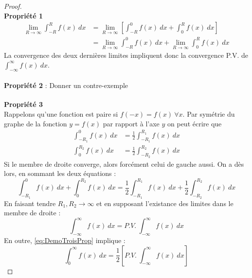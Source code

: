 	\begin{proof}\ \\
	\textbf{Propriété 1}
	\begin{equation}
		\begin{array}{ll}
	\lim\limits_{R\rightarrow\infty} \int_{-R}^R f(x)\ dx &= \lim\limits_{R\rightarrow\infty}
	\left[\int_{-R}^0 f(x)\ dx+\int_0^R f(x)\ dx\right]\\
	 &= \lim\limits_{R\rightarrow\infty} \int_{-R}^0 f(x)\ dx+ \lim\limits_{R\rightarrow\infty}
	 \int_0^R f(x)\ dx
	\end{array}
	\end{equation}
	La convergence des deux dernières limites impliquent donc la convergence P.V. de
	$\int_{-\infty}^\infty f(x)\ dx$.\ \\
	
	\ \\
	\textbf{Propriété 2} : Donner un contre-exemple\\	
	\ \\
	\textbf{Propriété 3}\\
	Rappelons qu'une fonction est paire si $f(-x)=f(x)\ \forall x$. Par symétrie du graphe
	de la fonction $y=f(x)$ par rapport à l'axe $y$ on peut écrire que 
	\begin{equation}
	\begin{array}{ll}
	\int_{-R_1}^0 f(x)\ dx &= \frac{1}{2}\int_{-R_1}^{R_1} f(x)\ dx\\
	\int^{R_2}_0 f(x)\ dx &= \frac{1}{2}\int_{-R_2}^{R_2} f(x)\ dx	
	\end{array}
	\label{eq:DemoTroisProp}
	\end{equation}
	Si le membre de droite converge, alors forcément celui de gauche aussi. On a dès lors, 
	en sommant les deux équations : 
	\begin{equation}
	\int_{-R_1}^0 f(x)\ dx + \int^{R_2}_0 f(x)\ dx  = \frac{1}{2}\int_{-R_1}^{R_1} f(x)\ dx
	+ \frac{1}{2}\int_{-R_2}^{R_2} f(x)\ dx	
	\end{equation}
	En faisant tendre $R_1,R_2\rightarrow\infty$ et en supposant l'existance des limites 
	dans le membre de droite :
	\begin{equation}
	\int_{-\infty}^\infty f(x)\ dx = P.V.\	\int_{-\infty}^\infty f(x)\ dx
	\end{equation}
	En outre, \autoref{eq:DemoTroisProp} implique :
	\begin{equation}
	\int_0^\infty f(x)\ dx = \frac{1}{2}\left[P.V.\	\int_{-\infty}^\infty f(x)\ dx\right]
	\end{equation}
	\end{proof}
	
